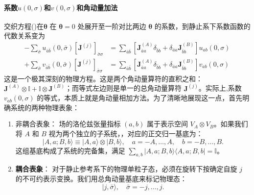 \paragraph*{系数$u(0,\sigma)$和$v(0,\sigma)$和角动量加法}交织方程()在$\boldsymbol{\theta}$ 在 $\boldsymbol{\theta}=0$ 处展开至一阶对比两边 $\boldsymbol{\theta}$ 的系数，到静止系下系数函数的代数关系变为
\begin{subequations}
    \begin{align}
       -\sum_{\bar{\sigma}} u_{\bar{a}\bar{b}}(0,\bar{\sigma}) \left[ \boldsymbol{J}^{(j)} \right]_{\bar{\sigma}\sigma} &= 
       \sum_{\bar{a}\bar{b}} \left[ \boldsymbol{J}^{(A)}_{\bar{a}a} \delta_{\bar{b}b} + \delta_{\bar{a}a} \boldsymbol{J}^{(B)}_{\bar{b}b} \right] u_{ab}(0,\sigma)
        \\
        +\sum_{\bar{\sigma}} v_{\bar{a}\bar{b}}(0,\bar{\sigma}) \left[ \boldsymbol{J}^{(j)} \right]_{\bar{\sigma}\sigma} &= 
        \sum_{\bar{a}\bar{b}} \left[ \boldsymbol{J}^{(A)}_{\bar{a}a} \delta_{\bar{b}b} + \delta_{\bar{a}a} \boldsymbol{J}^{(B)}_{\bar{b}b} \right] v_{ab}(0,\sigma)
    \end{align}
\end{subequations}
\color{blue}这是一个极其深刻的物理方程。这是两个角动量算符的直积之和：$\boldsymbol{J}^{(A)} \otimes \mathbb{I} + \mathbb{I} \otimes \boldsymbol{J}^{(B)}$；而等式左边则是单一的总角动量算符 $\boldsymbol{J}^{(j)}$。实际上,系数 $v_{ab}(0, \sigma)$ 的等式，本质上就是角动量相加方法\normalcolor。为了清晰地展现这一点，首先明确系统的两种物理表象：
\begin{enumerate}
    \item 非耦合表象：
    场的洛伦兹张量指标 $(a,b)$ 属于表示空间 $V_A \otimes V_B$。如果我们将 $A$ 和 $B$ 视为两个独立的子系统，，对应的正交归一基底为：
    \begin{equation}
        |A,a; B,b\rangle \equiv |A,a\rangle \otimes |B,b\rangle, \quad a = -A, \dots, A, \quad b = -B, \dots, B.
    \end{equation}
    这组基底构成了系统的完备集，满足 $\sum_{a,b} |A,a; B,b\rangle \langle A,a; B,b| = \mathbb{I}$。

    \item \textbf{耦合表象}：
    对于静止参考系下的物理单粒子态，必须在旋转下按确定自旋 $j$ 的不可约表示变换。我们用总角动量基底来标记物理态：
    \begin{equation}
        |j, \bar{\sigma}\rangle, \quad \bar{\sigma} = -j, \dots, j.
    \end{equation}
\end{enumerate}
